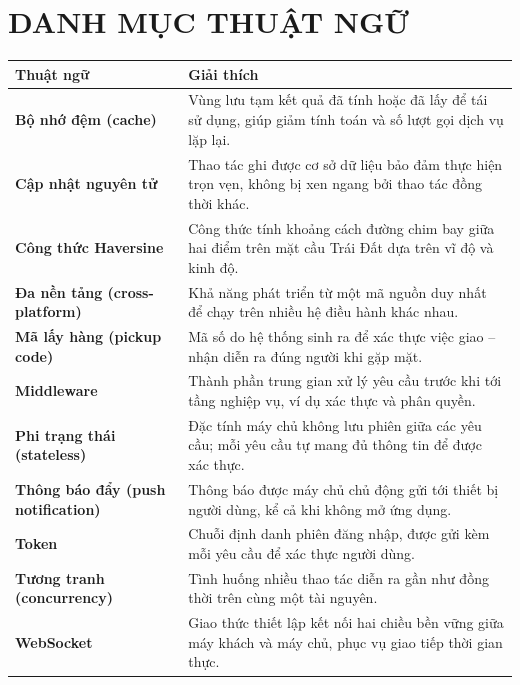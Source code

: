 \documentclass[../main.tex]{subfiles}
\begin{document}
\chapter*{DANH MỤC THUẬT NGỮ}
\begin{longtable}{p{}p{}}
\hline
\textbf{Thuật ngữ} & \textbf{Giải thích} \\ \hline
\endhead
\textbf{Bộ nhớ đệm (cache)} & Vùng lưu tạm kết quả đã tính hoặc đã lấy để tái sử dụng, giúp giảm tính toán và số lượt gọi dịch vụ lặp lại. \\
\textbf{Cập nhật nguyên tử} & Thao tác ghi được cơ sở dữ liệu bảo đảm thực hiện trọn vẹn, không bị xen ngang bởi thao tác đồng thời khác. \\
\textbf{Công thức Haversine} & Công thức tính khoảng cách đường chim bay giữa hai điểm trên mặt cầu Trái Đất dựa trên vĩ độ và kinh độ. \\
\textbf{Đa nền tảng (cross-platform)} & Khả năng phát triển từ một mã nguồn duy nhất để chạy trên nhiều hệ điều hành khác nhau. \\
\textbf{Mã lấy hàng (pickup code)} & Mã số do hệ thống sinh ra để xác thực việc giao -- nhận diễn ra đúng người khi gặp mặt. \\
\textbf{Middleware} & Thành phần trung gian xử lý yêu cầu trước khi tới tầng nghiệp vụ, ví dụ xác thực và phân quyền. \\
\textbf{Phi trạng thái (stateless)} & Đặc tính máy chủ không lưu phiên giữa các yêu cầu; mỗi yêu cầu tự mang đủ thông tin để được xác thực. \\
\textbf{Thông báo đẩy (push notification)} & Thông báo được máy chủ chủ động gửi tới thiết bị người dùng, kể cả khi không mở ứng dụng. \\
\textbf{Token} & Chuỗi định danh phiên đăng nhập, được gửi kèm mỗi yêu cầu để xác thực người dùng. \\
\textbf{Tương tranh (concurrency)} & Tình huống nhiều thao tác diễn ra gần như đồng thời trên cùng một tài nguyên. \\
\textbf{WebSocket} & Giao thức thiết lập kết nối hai chiều bền vững giữa máy khách và máy chủ, phục vụ giao tiếp thời gian thực. \\ \hline
\end{longtable}
\end{document}
